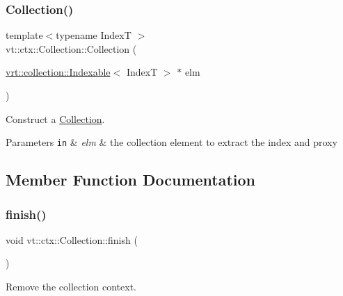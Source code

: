 \subsubsection{\texorpdfstring{Collection()}{Collection()}\hspace{0.1cm}{\footnotesize\ttfamily [2/2]}}
{\footnotesize\ttfamily template$<$typename IndexT $>$ \\
vt\+::ctx\+::\+Collection\+::\+Collection (\begin{DoxyParamCaption}\item[{\hyperlink{structvt_1_1vrt_1_1collection_1_1_indexable}{vrt\+::collection\+::\+Indexable}$<$ IndexT $>$ $\ast$}]{elm }\end{DoxyParamCaption})\hspace{0.3cm}{\ttfamily [explicit]}}



Construct a {\ttfamily \hyperlink{structvt_1_1ctx_1_1_collection}{Collection}}. 


\begin{DoxyParams}[1]{Parameters}
\mbox{\tt in}  & {\em elm} & the collection element to extract the index and proxy \\
\hline
\end{DoxyParams}


\subsection{Member Function Documentation}
\mbox{\label{structvt_1_1ctx_1_1_collection_a895a1ad1d3344e14a95a7553383281d8}} 
\subsubsection{\texorpdfstring{finish()}{finish()}}
{\footnotesize\ttfamily void vt\+::ctx\+::\+Collection\+::finish (\begin{DoxyParamCaption}{ }\end{DoxyParamCaption})}



Remove the collection context. 

\mbox{\label{structvt_1_1ctx_1_1_collection_a86fc6bda09b1cc705c99f7ccfba01fa2}} 
